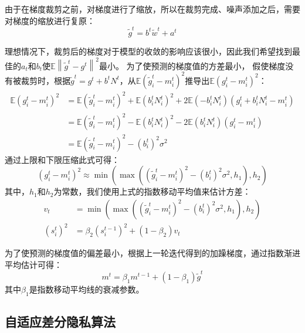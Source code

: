 由于在梯度裁剪之前，对梯度进行了缩放，所以在裁剪完成、噪声添加之后，需要对梯度的缩放进行复原：
\begin{equation}
\tilde{g}^{t}=b^{t} \tilde{w}^{t}+a^{t}
\end{equation}

理想情况下，裁剪后的梯度对于模型的收敛的影响应该很小，因此我们希望找到最佳的$a_{t}$和$b_{t}$使$\mathbb{E}\left\|\tilde{g}^{t}-g^{t}\right\|^{2}$最小。 
为了使预测的梯度值的方差最小， 假使梯度没有被裁剪时，根据$\tilde{g}^{t}=g^{t}+b^{t} N^{t}$，从$\mathbb{E}\left(\tilde{g}_{i}^{t}-m_{i}^{t}\right)^{2}$推导出$\mathbb{E}\left(g_{i}^{t}-m_{i}^{t}\right)^{2}$：
$$
\begin{aligned}
\mathbb{E}\left(g_{i}^{t}-m_{i}^{t}\right)^{2} &=\mathbb{E}\left(\tilde{g}_{i}^{t}-m_{i}^{t}\right)^{2}+\mathbb{E}\left(b_{i}^{t} N_{i}^{t}\right)^{2}+2 \mathbb{E}\left(-b_{i}^{t} N_{i}^{t}\right)\left(g_{i}^{t}+b_{i}^{t} N_{i}^{t}-m_{i}^{t}\right) \\
&=\mathbb{E}\left(\tilde{g}_{i}^{t}-m_{i}^{t}\right)^{2}-\mathbb{E}\left(b_{i}^{t} N_{i}^{t}\right)^{2}-2 \mathbb{E}\left(b_{i}^{t} N_{i}^{t}\right)\left(g_{i}^{t}-m_{i}^{t}\right) \\
&=\mathbb{E}\left(\tilde{g}_{i}^{t}-m_{i}^{t}\right)^{2}-\left(b_{i}^{t}\right)^{2} \sigma^{2}
\end{aligned}
$$
通过上限和下限压缩此式可得：
$$
\left(g_{i}^{t}-m_{i}^{t}\right)^{2} \approx \min \left(\max \left(\left(\tilde{g}_{i}^{t}-m_{i}^{t}\right)^{2}-\left(b_{i}^{t}\right)^{2} \sigma^{2}, h_{1}\right), h_{2}\right)
$$
其中，$h_{1}$和$h_{2}$为常数，我们使用上式的指数移动平均值来估计方差：
\begin{equation}\label{eq:梯度方差估计}
\begin{aligned}
v_{t} &=\min \left(\max \left(\left(\tilde{g}_{i}^{t}-m_{i}^{t}\right)^{2}-\left(b_{i}^{t}\right)^{2} \sigma^{2}, h_{1}\right), h_{2}\right) \\
\left(s_{i}^{t}\right)^{2} &=\beta_{2}\left(s_{i}^{t-1}\right)^{2}+\left(1-\beta_{2}\right) v_{t}
\end{aligned}
\end{equation}

为了使预测的梯度值的偏差最小，根据上一轮迭代得到的加躁梯度，通过指数渐进平均估计可得：
\begin{equation}\label{eq:梯度偏差估计}
m^{t}=\beta_{1} m^{t-1}+\left(1-\beta_{1}\right) \tilde{g}^{t}
\end{equation}
其中$\beta_{1}$是指数移动平均线的衰减参数。

\subsection{自适应差分隐私算法}

